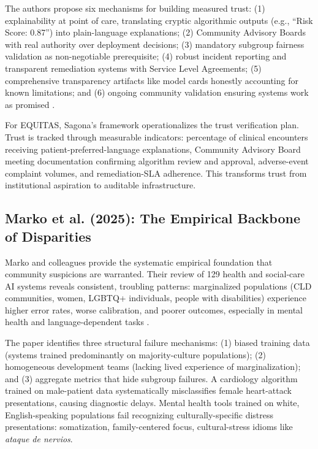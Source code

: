 \documentclass[12pt,a4paper]{article}
\begin{document}
The authors propose six mechanisms for building measured trust: (1) explainability at point of care, translating cryptic algorithmic outputs (e.g., ``Risk Score: 0.87'') into plain-language explanations; (2) Community Advisory Boards with real authority over deployment decisions; (3) mandatory subgroup fairness validation as non-negotiable prerequisite; (4) robust incident reporting and transparent remediation systems with Service Level Agreements; (5) comprehensive transparency artifacts like model cards honestly accounting for known limitations; and (6) ongoing community validation ensuring systems work as promised \citep{Sagona2025}.

For EQUITAS, Sagona's framework operationalizes the trust verification plan. Trust is tracked through measurable indicators: percentage of clinical encounters receiving patient-preferred-language explanations, Community Advisory Board meeting documentation confirming algorithm review and approval, adverse-event complaint volumes, and remediation-SLA adherence. This transforms trust from institutional aspiration to auditable infrastructure.

\subsection{Marko et al. (2025): The Empirical Backbone of Disparities}

Marko and colleagues provide the systematic empirical foundation that community suspicions are warranted. Their review of 129 health and social-care AI systems reveals consistent, troubling patterns: marginalized populations (CLD communities, women, LGBTQ+ individuals, people with disabilities) experience higher error rates, worse calibration, and poorer outcomes, especially in mental health and language-dependent tasks \citep{Marko2025}.

The paper identifies three structural failure mechanisms: (1) biased training data (systems trained predominantly on majority-culture populations); (2) homogeneous development teams (lacking lived experience of marginalization); and (3) aggregate metrics that hide subgroup failures. A cardiology algorithm trained on male-patient data systematically misclassifies female heart-attack presentations, causing diagnostic delays. Mental health tools trained on white, English-speaking populations fail recognizing culturally-specific distress presentations: somatization, family-centered focus, cultural-stress idioms like \textit{ataque de nervios}.
\end{document}
